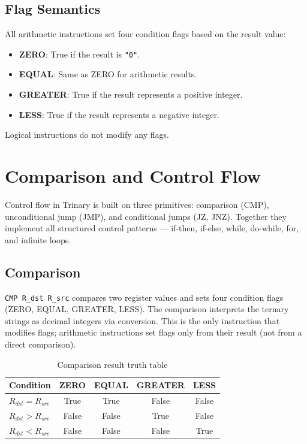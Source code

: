 \documentclass[10pt,a4paper,twoside]{book}
\begin{document}
\section{Flag Semantics}

All arithmetic instructions set four condition flags based on the result value:
\begin{itemize}
    \item \textbf{ZERO}: True if the result is \texttt{"0"}.
    \item \textbf{EQUAL}: Same as ZERO for arithmetic results.
    \item \textbf{GREATER}: True if the result represents a positive integer.
    \item \textbf{LESS}: True if the result represents a negative integer.
\end{itemize}
Logical instructions do not modify any flags.

\chapter{Comparison and Control Flow}
\label{ch:control}

Control flow in Trinary is built on three primitives: comparison (CMP),
unconditional jump (JMP), and conditional jumps (JZ, JNZ). Together they implement
all structured control patterns — if-then, if-else, while, do-while, for, and
infinite loops.

\section{Comparison}

\texttt{CMP R\_dst R\_src} compares two register values and sets four condition flags
(ZERO, EQUAL, GREATER, LESS). The comparison interprets the ternary strings as
decimal integers via conversion. This is the only instruction that modifies flags;
arithmetic instructions set flags only from their result (not from a direct
comparison).

\begin{table}[H]
\centering
\caption{Comparison result truth table}
\label{tab:cmptruth}
\begin{tabular}{lcccc}
\toprule
Condition & ZERO & EQUAL & GREATER & LESS \\
\midrule
$R_{dst} = R_{src}$ & True & True & False & False \\
$R_{dst} > R_{src}$ & False & False & True & False \\
$R_{dst} < R_{src}$ & False & False & False & True \\
\bottomrule
\end{tabular}
\end{table}
\end{document}
